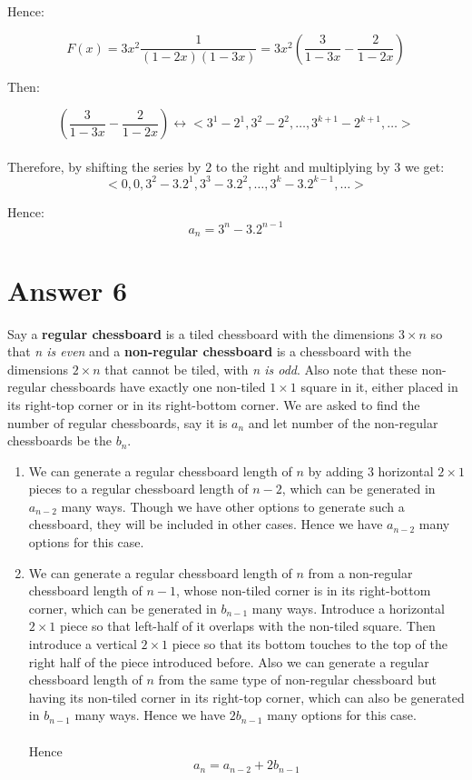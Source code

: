 \documentclass[12pt]{article}
\begin{document}
Hence:

$$F(x)=3 x^2 \frac{1}{(1-2x)(1-3x)}=3x^2\left(\frac{3}{1-3x}-\frac{2}{1-2x}\right)$$

Then:

$$\left(\frac{3}{1-3x}-\frac{2}{1-2x}\right) \longleftrightarrow 
<3^1 - 2^1, 3^2 - 2^2,\dots,3^{k+1} - 2^{k+1},\dots>$$ \\

Therefore, by shifting the series by $2$ to the right and multiplying by $3$ we get:
$$<0,0,3^2 - 3.2^1, 3^3 - 3.2^2,\dots,3^{k} - 3.2^{k-1},\dots>$$ 

Hence:
$$a_n=3^n-3.2^{n-1}$$

\section*{Answer 6}

Say a \textbf{regular chessboard} is a tiled chessboard with the dimensions $3\times n$ so that \textit{n is even} and a \textbf{non-regular chessboard} is a chessboard with the dimensions $2\times n$ that cannot be tiled, with \textit{n is odd}. Also note that these non-regular chessboards have exactly one non-tiled $1\times 1$ square in it, either placed in its right-top corner or in its right-bottom corner. We are asked to find the number of regular chessboards, say it is $a_n$ and let number of the non-regular chessboards be the $b_n$.\\

\begin{enumerate}
\item
We can generate a regular chessboard length of $n$ by adding $3$ horizontal $2\times 1$ pieces to a regular chessboard length of $n-2$, which can be generated in $a_{n-2}$ many ways. Though we have other options to generate such a chessboard, they will be included in other cases. Hence we have $a_{n-2}$ many options for this case.
\item
We can generate a regular chessboard length of $n$ from a non-regular chessboard length of $n-1$, whose non-tiled corner is in its right-bottom corner, which can be generated in $b_{n-1}$ many ways. Introduce a horizontal $2\times 1$ piece so that left-half of it overlaps with the non-tiled square. Then introduce a vertical $2\times 1$ piece so that its bottom touches to the top of the right half of the piece introduced before. Also we can generate a regular chessboard length of $n$ from the same type of non-regular chessboard but having its non-tiled corner in its right-top corner, which can also be generated in $b_{n-1}$ many ways. Hence we have $2b_{n-1}$ many options for this case.\\ \\
Hence \begin{equation}a_n=a_{n-2}+2b_{n-1} \end{equation}
\end{enumerate}
\end{document}
